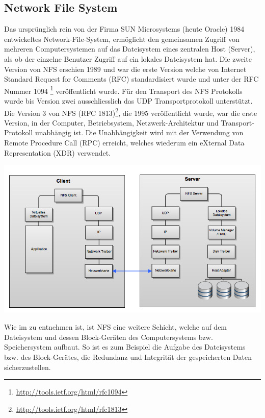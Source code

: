 \subsection{Network File System}
Das ursprünglich rein von der Firma SUN Microsystems (heute Oracle) 1984 entwickeltes Network-File-System, ermöglicht den gemeinsamen Zugriff von mehreren Computersystemen auf das Dateisystem eines zentralen Host (Server), als ob der einzelne Benutzer Zugriff auf ein lokales Dateisystem hat. Die zweite Version von NFS erschien 1989 und war die erste Version welche von Internet Standard Request for Comments (\gls{RFC}) standardisiert wurde und unter der \gls{RFC} Nummer 1094 \footnote{\url{http://tools.ietf.org/html/rfc1094}} veröffentlicht wurde. Für den Transport des NFS Protokolls wurde bis Version zwei ausschliesslich das \gls{UDP} Transportprotokoll unterstützt.
Die Version 3 von NFS (\gls{RFC} 1813)\footnote{\url{http://tools.ietf.org/html/rfc1813}}, die 1995 veröffentlicht wurde, war die erste Version, in der Computer, Betriebsystem, Netzwerk-Architektur und Transport-Protokoll unabhängig ist. Die Unabhängigkeit wird mit der Verwendung von Remote Procedure Call (\gls{RPC}) erreicht, welches wiederum ein eXternal Data Representation (\gls{XDR}) verwendet. \cite{Stern2001}

\begin{center}
\includegraphics[width=\linewidth, keepaspectratio = true]{media/NFS.png}
\end{center}

Wie im  zu entnehmen ist, ist NFS eine weitere Schicht, welche auf dem Dateisystem und dessen Block-Geräten des Computersystems bzw. Speichersystem aufbaut. So ist es zum Beispiel die Aufgabe des Dateisystems bzw. des Block-Gerätes, die Redundanz und Integrität der gespeicherten Daten sicherzustellen. 

